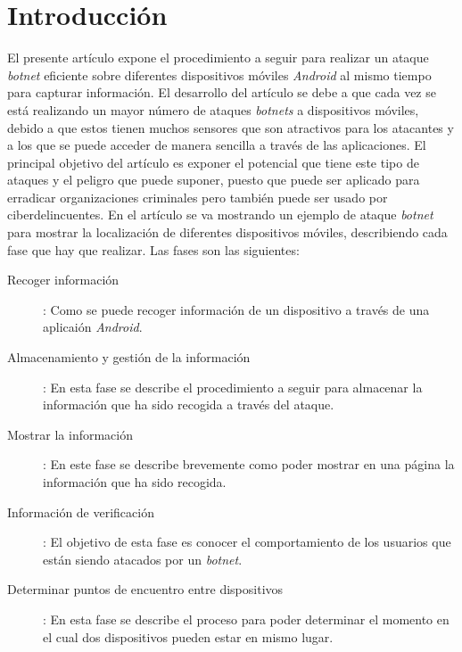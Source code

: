\documentclass[a4paper,11pt]{report}
\begin{document}
\chapter{Introducción}\label{Introduccion}

El presente artículo expone el procedimiento a seguir para realizar un ataque \emph{botnet} eficiente sobre diferentes dispositivos móviles \emph{Android} al mismo tiempo para capturar información. El desarrollo del artículo se debe a que cada vez se está realizando un mayor número de ataques \emph{botnets} a dispositivos móviles, debido a que estos tienen muchos sensores que son atractivos para los atacantes y a los que se puede acceder de manera sencilla a través de las aplicaciones. El principal objetivo del artículo es exponer el potencial que tiene este tipo de ataques y el peligro que puede suponer, puesto que puede ser aplicado para erradicar organizaciones criminales pero también puede ser usado por ciberdelincuentes. En el artículo se va mostrando un ejemplo de ataque \emph{botnet} para mostrar la localización de diferentes dispositivos móviles, describiendo cada fase que hay que realizar. Las fases son las siguientes:

 

\begin{description}
\item [Recoger información]: Como se puede recoger información de un dispositivo a través de una aplicaión \emph{Android}.

\item [Almacenamiento y gestión de la información]: En esta fase se describe el procedimiento a seguir para almacenar la información que ha sido recogida a través del ataque. 

\item [Mostrar la información]: En este fase se describe brevemente como poder mostrar en una página la información que ha sido recogida. 

\item [Información de verificación]: El objetivo de esta fase es conocer el comportamiento de los usuarios que están siendo atacados por un \emph{botnet}. 

\item [Determinar puntos de encuentro entre dispositivos]: En esta fase se describe el proceso para poder determinar el momento en el cual dos dispositivos pueden estar en mismo lugar. 

\end{description}
\end{document}
